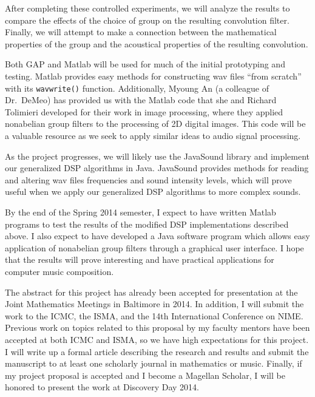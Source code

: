 \documentclass{article}
\begin{document}
After completing these controlled experiments, we will analyze the results to
compare the effects of the choice of group on the resulting convolution filter.
Finally, we will attempt to make a connection between the mathematical
properties of the group and the acoustical properties of the resulting
convolution.  

Both GAP and Matlab will be used for much of the initial prototyping and
testing. Matlab provides easy methods for constructing wav files ``from 
scratch'' with its {\tt wavwrite()} function. Additionally, Myoung An (a colleague of
Dr.~DeMeo) has provided us with the Matlab code that she and Richard Tolimieri
developed for their work in image processing, where they applied nonabelian group
filters to the processing of 2D digital images. This code will be a valuable
resource as we seek to apply similar ideas to audio signal processing.  

As the project progresses, we will likely use the JavaSound library and
implement our generalized \ac{DSP} algorithms in Java.  JavaSound provides methods
for reading and altering wav files frequencies and sound intensity levels, which
will prove useful when we apply our generalized \ac{DSP} algorithms to more complex
sounds.

\vskip5mm


By the end of the Spring 2014 semester, I expect to have written Matlab programs
to test the results of the modified \ac{DSP} implementations described above.  I also
expect to have developed a Java software program which allows easy application
of nonabelian group filters through a graphical user interface.  I hope that the
results will prove interesting and have practical applications for computer
music composition.  

The abstract for this project has already been accepted for presentation at the
Joint Mathematics Meetings in Baltimore in 2014.  In addition, I will submit the
work to the \ac{ICMC}, the \ac{ISMA}, and the 14th International
Conference on \ac{NIME}. Previous work on
topics related to this proposal by my faculty mentors have been accepted at both
ICMC and ISMA,
 so we have high expectations for this project. I will write up a formal article 
describing the research and results and submit the manuscript to at least
one scholarly journal in mathematics or music. Finally, if my project proposal
is accepted and I become a Magellan Scholar, I will be honored to present the
work at Discovery Day 2014.   
\end{document}
